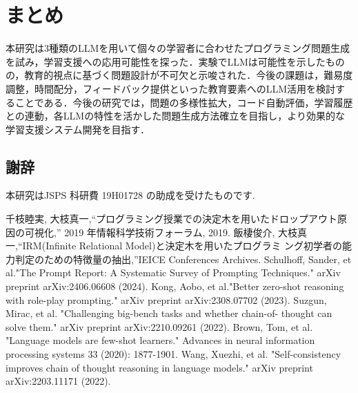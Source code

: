 \documentclass[twocolumn, fleqn, uplatex]{jsarticle}
\begin{document}
\section{まとめ}
本研究は3種類のLLMを用いて個々の学習者に合わせたプログラミング問題生成を試み，学習支援への応用可能性を探った．実験でLLMは可能性を示したものの，教育的視点に基づく問題設計が不可欠と示唆された．今後の課題は，難易度調整，時間配分，フィードバック提供といった教育要素へのLLM活用を検討することである．今後の研究では，問題の多様性拡大，コード自動評価，学習履歴との連動，各LLMの特性を活かした問題生成方法確立を目指し，より効果的な学習支援システム開発を目指す．

\subsection*{謝辞}
本研究はJSPS 科研費 19H01728 の助成を受けたものです.

\begin{thebibliography}{9}
  \renewcommand{\baselinestretch}{1.0}
  千枝睦実, 大枝真一,“プログラミング授業での決定木を用いたドロップアウト原因の可視化,” 2019 年情報科学技術フォーラム, 2019.
  飯棲俊介, 大枝真一,“IRM(Infinite Relational Model)と決定木を用いたプログラミ ング初学者の能力判定のための特徴量の抽出,”IEICE Conferences Archives.
  Schulhoff, Sander, et al."The Prompt Report: A Systematic Survey of Prompting Techniques." arXiv preprint arXiv:2406.06608 (2024).
  Kong, Aobo, et al."Better zero-shot reasoning with role-play prompting." arXiv preprint arXiv:2308.07702 (2023).
  Suzgun, Mirac, et al. "Challenging big-bench tasks and whether chain-of- thought can solve them." arXiv preprint arXiv:2210.09261 (2022).
  Brown, Tom, et al. "Language models are few-shot learners." Advances in neural information processing systems 33 (2020): 1877-1901.
   Wang, Xuezhi, et al. "Self-consistency improves chain of thought reasoning in language models." arXiv preprint arXiv:2203.11171 (2022).

  
\end{thebibliography}
\end{document}
